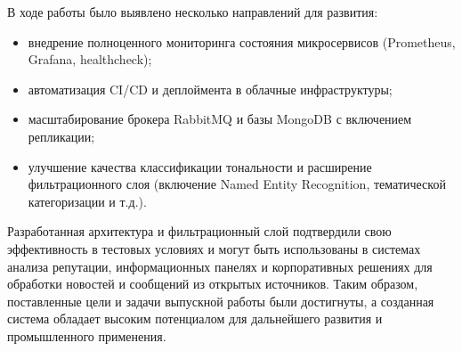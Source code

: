 В ходе работы было выявлено несколько направлений для развития:
\begin{itemize}
  \item внедрение полноценного мониторинга состояния микросервисов (Prometheus, Grafana, healthcheck);
  \item автоматизация CI/CD и деплоймента в облачные инфраструктуры;
  \item масштабирование брокера RabbitMQ и базы MongoDB с включением репликации;
  \item улучшение качества классификации тональности и расширение фильтрационного слоя (включение Named Entity Recognition, тематической категоризации и т.д.).
\end{itemize}

Разработанная архитектура и фильтрационный слой подтвердили свою эффективность в тестовых условиях и могут быть использованы в системах анализа репутации, информационных панелях и корпоративных решениях для обработки новостей и сообщений из открытых источников.
Таким образом, поставленные цели и задачи выпускной работы были достигнуты, а созданная система обладает высоким потенциалом для дальнейшего развития и промышленного применения.


